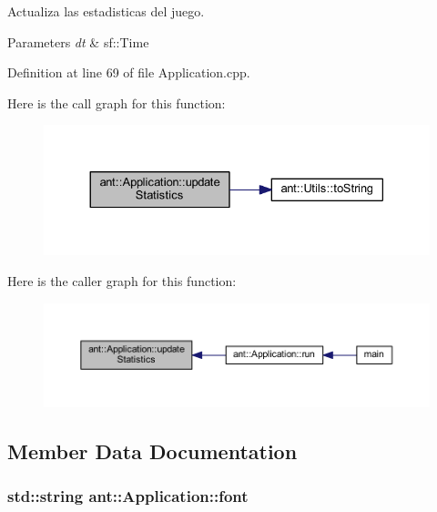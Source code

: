 Actualiza las estadisticas del juego. 


\begin{DoxyParams}{Parameters}
{\em dt} & sf\+::\+Time \\
\hline
\end{DoxyParams}


Definition at line 69 of file Application.\+cpp.



Here is the call graph for this function\+:
\nopagebreak
\begin{figure}[H]
\begin{center}
\leavevmode
\includegraphics[width=330pt]{d7/d57/classant_1_1_application_a46fc32ba7689d272e8fe7d8f917ddaff_cgraph}
\end{center}
\end{figure}




Here is the caller graph for this function\+:
\nopagebreak
\begin{figure}[H]
\begin{center}
\leavevmode
\includegraphics[width=350pt]{d7/d57/classant_1_1_application_a46fc32ba7689d272e8fe7d8f917ddaff_icgraph}
\end{center}
\end{figure}




\subsection{Member Data Documentation}
\hypertarget{classant_1_1_application_a0d20386c229838fe386929ddd5fbd678}{
\subsubsection[{font}]{\setlength{\rightskip}{0pt plus 5cm}std\+::string ant\+::\+Application\+::font\hspace{0.3cm}{\ttfamily [private]}}}\label{classant_1_1_application_a0d20386c229838fe386929ddd5fbd678}


